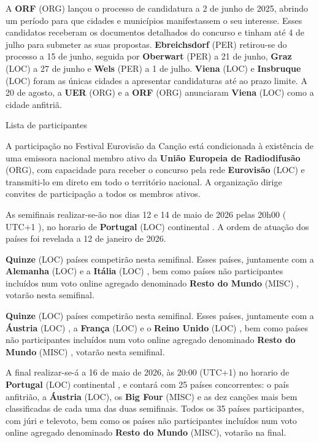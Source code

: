 \documentclass[12pt,a4paper]{article}
\begin{document}
A \textbf{ORF} (ORG) lançou o processo de candidatura a 2 de junho de 2025, abrindo um período para que cidades e municípios manifestassem o seu interesse. Esses candidatos receberam os documentos detalhados do concurso e tinham até 4 de julho para submeter as suas propostas. \textbf{Ebreichsdorf} (PER) retirou-se do processo a 15 de junho, seguida por \textbf{Oberwart} (PER) a 21 de junho, \textbf{Graz} (LOC) a 27 de junho e \textbf{Wels} (PER) a 1 de julho. \textbf{Viena} (LOC) e \textbf{Insbruque} (LOC) foram as únicas cidades a apresentar candidaturas até ao prazo limite. A 20 de agosto, a \textbf{UER} (ORG) e a \textbf{ORF} (ORG) anunciaram \textbf{Viena} (LOC) como a cidade anfitriã.



Lista de participantes

A participação no Festival Eurovisão da Canção está condicionada à existência de uma emissora nacional membro ativo da \textbf{União Europeia de Radiodifusão} (ORG), com capacidade para receber o concurso pela rede \textbf{Eurovisão} (LOC) e transmiti-lo em direto em todo o território nacional. A organização dirige convites de participação a todos os membros ativos.

As semifinais realizar-se-ão nos dias 12 e 14 de maio de 2026 pelas 20h00 ( UTC+1 ), no horario de \textbf{Portugal} (LOC) continental . A ordem de atuação dos países foi revelada a 12 de janeiro de 2026.

\textbf{Quinze} (LOC) países competirão nesta semifinal. Esses países, juntamente com a \textbf{Alemanha} (LOC) e a \textbf{Itália} (LOC) , bem como países não participantes incluídos num voto online agregado denominado  \textbf{Resto do Mundo} (MISC) , votarão nesta semifinal.

\textbf{Quinze} (LOC) países competirão nesta semifinal. Esses países, juntamente com a \textbf{Áustria} (LOC) , a \textbf{França} (LOC) e o \textbf{Reino Unido} (LOC) , bem como países não participantes incluídos num voto online agregado denominado  \textbf{Resto do Mundo} (MISC) , votarão nesta semifinal.

A final realizar-se-á a 16 de maio de 2026, às 20:00 (UTC+1) no horario de \textbf{Portugal} (LOC) continental , e contará com 25 países concorrentes: o país anfitrião, a \textbf{Áustria} (LOC), os \textbf{Big Four} (MISC) e as dez canções mais bem classificadas de cada uma das duas semifinais. Todos os 35 países participantes, com júri e televoto, bem como os países não participantes incluídos num voto online agregado denominado \textbf{Resto do Mundo} (MISC), votarão na final.
\end{document}
